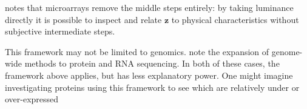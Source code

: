 \documentclass{article}
\newcommand{\ve}[1]{\mathbf{#1}}           %
\begin{document}
\cite{laframboise2009} notes that microarrays remove the middle steps entirely: by taking luminance directly it is possible to inspect and relate $\ve{z}$ to physical characteristics without subjective intermediate steps.

This framework may not be limited to genomics. \cite{hasinetal2017multi} note the expansion of genome-wide methods to protein and RNA sequencing. In both of these cases, the framework above applies, but has less explanatory power. One might imagine investigating proteins using this framework to see which are relatively under or over-expressed


\renewcommand*{\bibname}{References} %

\end{document}

